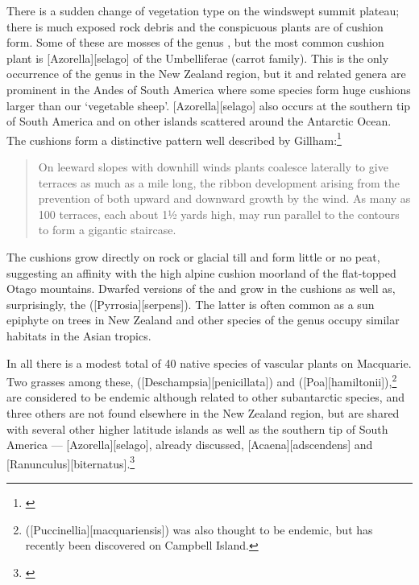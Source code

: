 There is a sudden change of vegetation type on the windswept summit plateau; there is much exposed rock debris and the conspicuous plants are of cushion form.
Some of these are mosses of the genus , but the most common cushion plant is [Azorella][selago] of the Umbelliferae (carrot family).
This is the only occurrence of the genus in the New Zealand region, but it and related genera are prominent in the Andes of South America where some species form huge cushions larger than our `vegetable sheep'.
[Azorella][selago] also occurs at the southern tip of South America and on other islands scattered around the Antarctic Ocean.
The  cushions form a distinctive pattern well described by Gillham:\footnote{\cite{gillham1967sub}}

\begin{quote}
	On leeward slopes with downhill winds  plants coalesce laterally to give terraces as much as a mile long, the ribbon development arising from the prevention of both upward and downward growth by the wind.
	As many as 100 terraces, each about 1½ yards high, may run parallel to the contours to form a gigantic staircase.
\end{quote}

The cushions grow directly on rock or glacial till and form little or no peat, suggesting an affinity with the high alpine cushion moorland of the flat-topped Otago mountains.
Dwarfed versions of the  and  grow in the cushions as well as, surprisingly, the  ([Pyrrosia][serpens]).
The latter is often common as a sun epiphyte on trees in New Zealand and other species of the genus occupy similar habitats in the Asian tropics.

In all there is a modest total of 40 native species of vascular plants on Macquarie.
Two grasses among these,  ([Deschampsia][penicillata]) and  ([Poa][hamiltonii]),\footnote{ ([Puccinellia][macquariensis]) was also thought to be endemic, but has recently been discovered on Campbell Island.} are considered to be endemic although related to other subantarctic species, and three others are not found elsewhere in the New Zealand region, but are shared with several other higher latitude islands as well as the southern tip of South America --- [Azorella][selago], already discussed, [Acaena][adscendens] and [Ranunculus][biternatus].\footnote{\cite{wace1960botany}}

